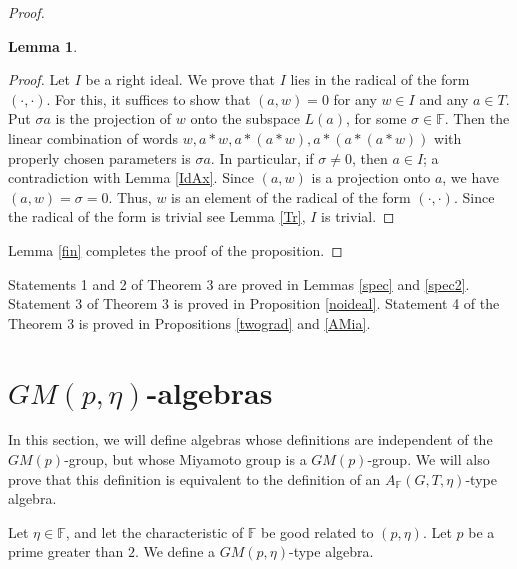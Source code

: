 \documentclass[12pt]{article}
\newcommand\F{\mathbb{F}}
\newcommand\la{\langle}
\newcommand\ra{\rangle}
\newcommand\lla{\la\!\la}
\newcommand\rra{\ra\!\ra}
\newtheorem{lem}{Lemma}
\begin{document}
\begin{proof}
\begin{lem}
\end{lem}
	\begin{proof}
Let $I$ be a right ideal. We prove that $I$ lies in the radical of the form $(\cdot,\cdot)$. For this, it suffices to show that $(a,w)=0$ for any $w\in I$ and any $a\in T$. Put $\sigma a$ is the projection of $w$ onto the subspace $L(a)$, for some $\sigma\in \F$. Then the linear combination of words $w,a*w,a*(a*w),a*(a*(a*w))$ with properly chosen parameters is $\sigma a$. In particular, if $\sigma\neq 0$, then $a\in I$; a contradiction with Lemma \ref{IdAx}. Since $(a,w)$ is a projection onto $a$, we have $(a,w)=\sigma=0$. Thus, $w$ is an element of the radical of the form $(\cdot,\cdot)$. Since the radical of the form is trivial see Lemma \ref{Tr}, $I$ is trivial.
	\end{proof}
	Lemma \ref{fin} completes the proof of the proposition.
\end{proof}

Statements 1 and 2 of Theorem 3 are proved in Lemmas \ref{spec} and \ref{spec2}. Statement 3 of Theorem 3 is proved in Proposition \ref{noideal}.
Statement 4 of the Theorem 3 is proved in Propositions \ref{twograd} and \ref{AMia}.


\section{$GM(p,\eta)$-algebras}
%
In this section, we will define algebras whose definitions are independent of the $GM(p)$-group, but whose Miyamoto group is a $GM(p)$-group. We will also prove that this definition is equivalent to the definition of an $A_{\F}(G,T,\eta)$-type algebra.

Let  $\eta\in \F$, and let the characteristic of $\F$ be good related to $(p,\eta)$. Let $p$ be a prime greater than $2$. We define a $GM(p,\eta)$-type algebra.
\end{document}
